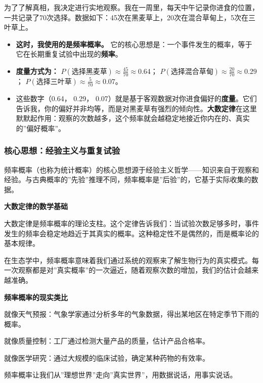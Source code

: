 \documentclass[
]{book}
\providecommand{\tightlist}{%
  \setlength{\itemsep}{0pt}\setlength{\parskip}{0pt}}
\begin{document}
为了了解真相，我决定进行实地观察。我在一周里，每天中午记录你进食的位置，一共记录了70次选择。数据如下：45次在黑麦草上，20次在混合草甸上，5次在三叶草上。

\begin{itemize}
\tightlist
\item
  \textbf{这时，我使用的是频率概率。} 它的核心思想是：一个事件发生的概率，等于它在长期重复试验中出现的\textbf{频率}。
\item
  \textbf{度量方式为：} \(P(\text{选择黑麦草}) \approx \frac{45}{70} \approx 0.64\)； \(P(\text{选择混合草甸}) \approx \frac{20}{70} \approx 0.29\)； \(P(\text{选择三叶草}) \approx \frac{5}{70} \approx 0.07\)。
\item
  这些数字（0.64， 0.29， 0.07）就是基于客观数据对你进食偏好的\textbf{度量}。它们告诉我，你的偏好并非均等，而是对黑麦草有强烈的倾向性。\textbf{大数定律}在这里默默起作用：观察的次数越多，这个频率就会越稳定地接近你内在的、真实的''偏好概率''。
\end{itemize}

\hypertarget{ux6838ux5fc3ux601dux60f3ux7ecfux9a8cux4e3bux4e49ux4e0eux91cdux590dux8bd5ux9a8c}{%
\subsubsection{核心思想：经验主义与重复试验}\label{ux6838ux5fc3ux601dux60f3ux7ecfux9a8cux4e3bux4e49ux4e0eux91cdux590dux8bd5ux9a8c}}

频率概率（也称为统计概率）的核心思想源于经验主义哲学------知识来自于观察和经验。与古典概率的''先验''推理不同，频率概率是''后验''的，它基于实际收集的数据。

\textbf{大数定律的数学基础}

大数定律是频率概率的理论支柱。这个定律告诉我们：当试验次数足够多时，事件发生的频率会稳定地趋近于其真实的概率。这种稳定性不是偶然的，而是概率论的基本规律。

在生态学中，频率概率意味着我们通过系统的观察来了解生物行为的真实模式。每一次观察都是对''真实概率''的一次逼近，随着观察次数的增加，我们的估计会越来越准确。

\textbf{频率概率的现实类比}

就像天气预报：气象学家通过分析多年的气象数据，得出某地区在特定季节下雨的概率。

就像质量控制：工厂通过检测大量产品的质量，估计产品合格率。

就像医学研究：通过大规模的临床试验，确定某种药物的有效率。

频率概率让我们从''理想世界''走向''真实世界''，用数据说话，用事实说话。
\end{document}
